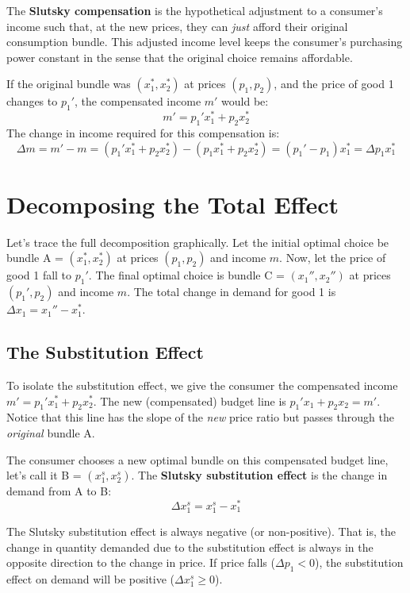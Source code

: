 \begin{definition}
    The \textbf{Slutsky compensation} is the hypothetical adjustment to a consumer's income such that, at the new prices, they can \textit{just} afford their original consumption bundle. This adjusted income level keeps the consumer's purchasing power constant in the sense that the original choice remains affordable.
\end{definition}

If the original bundle was \((x_1^*, x_2^*)\) at prices \((p_1, p_2)\), and the price of good 1 changes to \(p_1'\), the compensated income \(m'\) would be:
\[
m' = p_1' x_1^* + p_2 x_2^*
\]
The change in income required for this compensation is:
\[
\Delta m = m' - m = (p_1' x_1^* + p_2 x_2^*) - (p_1 x_1^* + p_2 x_2^*) = (p_1' - p_1)x_1^* = \Delta p_1 x_1^*
\]

\section{Decomposing the Total Effect}

Let's trace the full decomposition graphically.
Let the initial optimal choice be bundle A = \((x_1^*, x_2^*)\) at prices \((p_1, p_2)\) and income \(m\).
Now, let the price of good 1 fall to \(p_1'\). The final optimal choice is bundle C = \((x_1'', x_2'')\) at prices \((p_1', p_2)\) and income \(m\). The total change in demand for good 1 is \(\Delta x_1 = x_1'' - x_1^*\).

\subsection{The Substitution Effect}
To isolate the substitution effect, we give the consumer the compensated income \(m' = p_1' x_1^* + p_2 x_2^*\). The new (compensated) budget line is \(p_1' x_1 + p_2 x_2 = m'\). Notice that this line has the slope of the \textit{new} price ratio but passes through the \textit{original} bundle A.

The consumer chooses a new optimal bundle on this compensated budget line, let's call it B = \((x_1^s, x_2^s)\).
The \textbf{Slutsky substitution effect} is the change in demand from A to B\@:
\[
\Delta x_1^s = x_1^s - x_1^*
\]

\begin{proposition}
The Slutsky substitution effect is always negative (or non-positive). That is, the change in quantity demanded due to the substitution effect is always in the opposite direction to the change in price. If price falls (\(\Delta p_1 < 0\)), the substitution effect on demand will be positive (\(\Delta x_1^s \ge 0\)).
\end{proposition}


